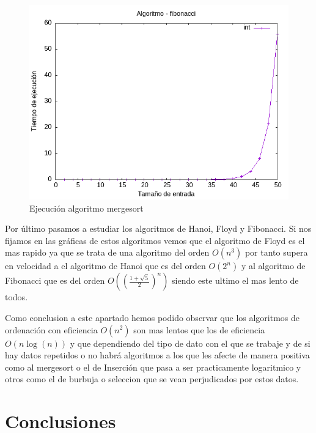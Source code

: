\documentclass[11pt]{article}
\begin{document}
    \begin{figure}[H]
        \begin{minipage}{0.5\textwidth}
            \centering
            \includegraphics[width=\linewidth]{assets/Img/fibonacciint.png}
            \caption{Ejecución algoritmo mergesort}
            \label{fig:mergesort}
        \end{minipage}
    \end{figure}

    Por último pasamos a estudiar los algoritmos de Hanoi, Floyd y Fibonacci. Si nos fijamos en las gráficas de estos algoritmos vemos que el algoritmo de Floyd es el mas rapido ya que se trata de una algoritmo del orden \(O(n^3)\) por tanto 
    supera en velocidad a el algoritmo de Hanoi que es del orden \(O(2^n)\) y al algoritmo de Fibonacci que es del orden \(O((\frac{1+\sqrt{5}}{2})^n)\) siendo este ultimo el mas lento de todos.


    Como conclusion a este apartado hemos podido observar que los algoritmos de ordenación con eficiencia \(O(n^2)\) son mas lentos que los de eficiencia \(O(n\log(n))\) y que dependiendo del tipo de dato con el que se trabaje y de si hay datos repetidos o no habrá algoritmos a los que les afecte de manera 
    positiva como al mergesort o el de Inserción que pasa a ser practicamente logaritmico  y otros como el de burbuja o seleccion que se vean perjudicados por estos datos. 

\section{Conclusiones}
\end{document}
